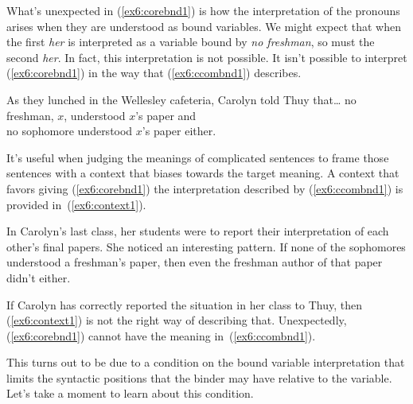 What's unexpected in (\ref{ex6:corebnd1}) is how the interpretation of the pronouns arises when they are understood as bound variables. We might expect that when the first \emph{her} is interpreted as a variable bound by \emph{no freshman}, so must the second \emph{her}. In fact, this interpretation is not possible. It isn't possible to interpret (\ref{ex6:corebnd1}) in the way that (\ref{ex6:ccombnd1}) describes.
\begin{exe}
	\raggedright
	\ex \label{ex6:ccombnd1} As they lunched in the Wellesley cafeteria, Carolyn told Thuy that\ldots
	\sn no freshman, $x$, understood $x$'s paper and\\
	no sophomore understood $x$'s paper either.
\end{exe}
It's useful when judging the meanings of complicated sentences to frame those sentences with a context that biases towards the target meaning. A context that favors giving (\ref{ex6:corebnd1}) the interpretation described by (\ref{ex6:ccombnd1}) is provided in~(\ref{ex6:context1}).
\begin{exe}
	\raggedright
	\sn 
	In Carolyn's last class, her students were to report their interpretation of each other's final papers. She noticed an interesting pattern. If none of the sophomores understood a freshman's paper, then even the freshman author of that paper didn't either.
\end{exe}
%
%
%
If Carolyn has correctly reported the situation in her class to Thuy, then (\ref{ex6:context1}) is not the right way of describing that. Unexpectedly, (\ref{ex6:corebnd1}) cannot have the meaning in~(\ref{ex6:ccombnd1}).

This turns out to be due to a condition on the bound variable interpretation that limits the syntactic positions that the binder may have relative to the variable. Let's take a moment to learn about this condition.

